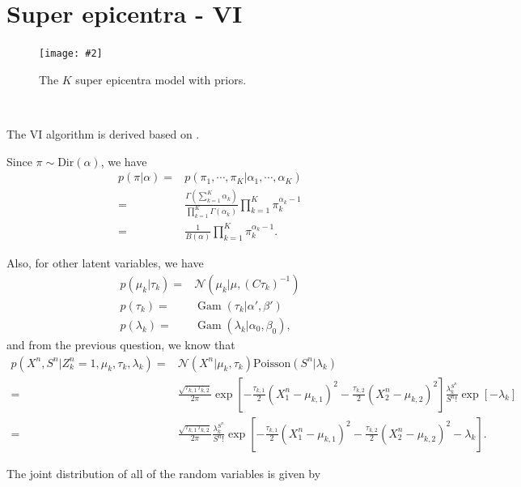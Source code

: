 \documentclass[11pt]{extarticle}
\newcommand{\N}{\mathcal{N}}
\newcommand{\0}{\mathbf{0}}
\renewcommand{\(}{\left(}
\renewcommand{\)}{\right)}
\DeclareMathOperator{\Gam}{Gam}
\theoremstyle{definition}
\newcommand{\image}[3]{
	\begin{figure}[!ht]
		\centering
	    \texttt{[image: \#2]}
		\caption{#3}
		\label{fig:#2}
	\end{figure}
}
\begin{document}
\section{Super epicentra - VI}
\image{0.5}{Q2_2_6}{The $K$ super epicentra model with priors.}
\noindent{} \\
\par The VI algorithm is derived based on \cite{Bishop}.
\par Since $\pi \sim \mathrm{Dir}(\alpha)$, we have
\begin{align*}
	p(\pi \vert \alpha) =& p(\pi_{1}, \cdots, \pi_{K} \vert \alpha_{1}, \cdots, \alpha_{K}) \\
	=& \frac{\Gamma\left(\sum_{k=1}^{K} \alpha_{k}\right)}{\prod_{k=1}^{K}\Gamma(\alpha_{k})} \prod_{k=1}^{K} \pi_{k}^{\alpha_{k}-1} \\
	=& \frac{1}{B(\alpha)} \prod_{k=1}^{K} \pi_{k}^{\alpha_{k}-1}.
\end{align*}
\par Also, for other latent variables, we have
\begin{align*}
	p(\mu_{k} \vert \tau_{k}) =& \N(\mu_{k} \vert \mu, (C \tau_{k})^{-1}) \\
	p(\tau_{k}) =& \Gam(\tau_{k} \vert \alpha', \beta') \\
	p(\lambda_{k}) =& \Gam(\lambda_{k} \vert \alpha_{0}, \beta_{0}),
\end{align*}
and from the previous question, we know that
\begin{align*}
	p(X^{n}, S^{n} \vert Z^{n}_{k}=1, \mu_{k}, \tau_{k}, \lambda_{k}) =& \N(X^{n} \vert \mu_{k}, \tau_{k}) \mathrm{Poisson}(S^{n} \vert \lambda_{k}) \\ 
	=& \frac{\sqrt{\tau_{k,1}\tau_{k,2}}}{2\pi} \exp\left[-\frac{\tau_{k,1}}{2}(X^{n}_{1} - \mu_{k,1})^{2} - \frac{\tau_{k,2}}{2}(X^{n}_{2} - \mu_{k,2})^{2}\right] \frac{\lambda_{k}^{S^{n}}}{S^{n}!} \exp\left[-\lambda_{k}\right] \\
	=& \frac{\sqrt{\tau_{k,1}\tau_{k,2}}}{2\pi} \frac{\lambda_{k}^{S^{n}}}{S^{n}!} \exp\left[-\frac{\tau_{k,1}}{2}(X^{n}_{1} - \mu_{k,1})^{2} - \frac{\tau_{k,2}}{2}(X^{n}_{2} - \mu_{k,2})^{2} -\lambda_{k}\right].
\end{align*}
\par The joint distribution of all of the random variables is given by
\end{document}
